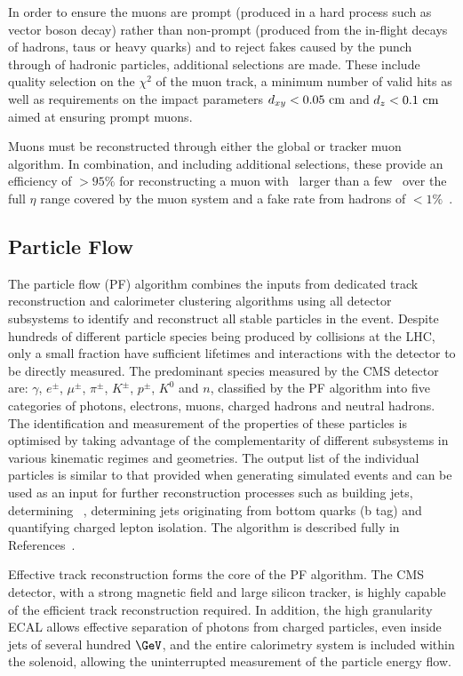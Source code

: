 In order to ensure the muons are prompt (produced in a hard process such as vector boson decay) rather
than non-prompt (produced from the in-flight decays of hadrons, taus or heavy quarks) and to reject fakes
caused by the punch through of hadronic particles, additional selections are made. These include quality
selection on the $\chi^2$ of the muon track, a minimum number of valid hits as well as requirements
on the impact parameters $d_{xy} < 0.05\,\,\text{cm}$ and $d_{z} < 0.1\,\,\text{cm}$ aimed at ensuring prompt muons.

Muons must be reconstructed through either the global or tracker muon algorithm. In combination, and
including additional selections, these provide an efficiency of $>95\%$ for reconstructing a muon 
with \pt~larger than a few \GeV~over the full $\eta$ range covered by the
muon system and a fake rate from hadrons of $<1\%$~\cite{muon_reco}.

\subsection{Particle Flow}
\label{sec:particle_flow}
The particle flow (PF) algorithm combines the inputs from dedicated track reconstruction and calorimeter clustering
algorithms using all detector subsystems to identify and reconstruct all stable particles in the event.
Despite hundreds of different particle species being produced by collisions at the LHC, only a small fraction
have sufficient lifetimes and interactions with the detector to be directly measured. The predominant species
measured by the CMS detector are: $\gamma$, $e^{\pm}$, $\mu^{\pm}$, $\pi^{\pm}$, $K^{\pm}$, $p^{\pm}$, $K^{0}$
and $n$, classified by the PF algorithm into five categories of photons, electrons, muons, charged hadrons and neutral hadrons. 
The identification and measurement of the properties of these particles is optimised by taking advantage of the complementarity of 
different subsystems in various kinematic regimes and geometries. The output list of the individual particles is similar to that provided
when generating simulated events and can be used as an input for further reconstruction processes
such as building jets, determining \met~, determining jets originating from bottom quarks (b tag) and quantifying
charged lepton isolation. The algorithm is described fully in References~\cite{pf_proc,pf_pas}.

Effective track reconstruction forms the core of the PF algorithm. The CMS detector, with a strong magnetic field
and large silicon tracker, is highly capable of the efficient track
reconstruction required. In addition, the high granularity ECAL allows effective separation of photons from 
charged particles, even inside jets of several hundred $\GeV$, and the entire calorimetry system 
is included within the solenoid, allowing the uninterrupted measurement 
of the particle energy flow.

